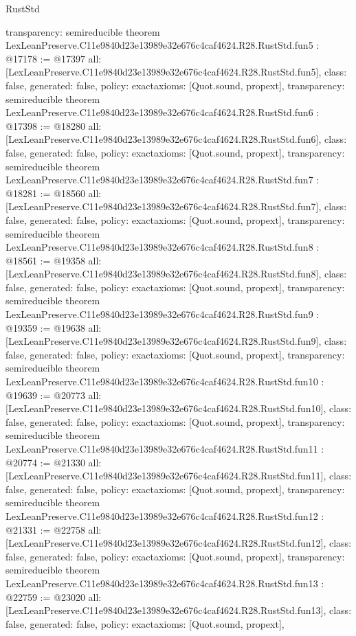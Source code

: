 \begin{lexlean}{RustStd}
\begin{coremodule}
{  transparency: semireducible
}
theorem LexLeanPreserve.C11e9840d23e13989e32e676c4caf4624.R28.RustStd.fun5 : @17178 := @17397 {
  all: [LexLeanPreserve.C11e9840d23e13989e32e676c4caf4624.R28.RustStd.fun5],
  class: false,
  generated: false,
  policy: exact{axioms: [Quot.sound, propext]},
  transparency: semireducible
}
theorem LexLeanPreserve.C11e9840d23e13989e32e676c4caf4624.R28.RustStd.fun6 : @17398 := @18280 {
  all: [LexLeanPreserve.C11e9840d23e13989e32e676c4caf4624.R28.RustStd.fun6],
  class: false,
  generated: false,
  policy: exact{axioms: [Quot.sound, propext]},
  transparency: semireducible
}
theorem LexLeanPreserve.C11e9840d23e13989e32e676c4caf4624.R28.RustStd.fun7 : @18281 := @18560 {
  all: [LexLeanPreserve.C11e9840d23e13989e32e676c4caf4624.R28.RustStd.fun7],
  class: false,
  generated: false,
  policy: exact{axioms: [Quot.sound, propext]},
  transparency: semireducible
}
theorem LexLeanPreserve.C11e9840d23e13989e32e676c4caf4624.R28.RustStd.fun8 : @18561 := @19358 {
  all: [LexLeanPreserve.C11e9840d23e13989e32e676c4caf4624.R28.RustStd.fun8],
  class: false,
  generated: false,
  policy: exact{axioms: [Quot.sound, propext]},
  transparency: semireducible
}
theorem LexLeanPreserve.C11e9840d23e13989e32e676c4caf4624.R28.RustStd.fun9 : @19359 := @19638 {
  all: [LexLeanPreserve.C11e9840d23e13989e32e676c4caf4624.R28.RustStd.fun9],
  class: false,
  generated: false,
  policy: exact{axioms: [Quot.sound, propext]},
  transparency: semireducible
}
theorem LexLeanPreserve.C11e9840d23e13989e32e676c4caf4624.R28.RustStd.fun10 : @19639 := @20773 {
  all: [LexLeanPreserve.C11e9840d23e13989e32e676c4caf4624.R28.RustStd.fun10],
  class: false,
  generated: false,
  policy: exact{axioms: [Quot.sound, propext]},
  transparency: semireducible
}
theorem LexLeanPreserve.C11e9840d23e13989e32e676c4caf4624.R28.RustStd.fun11 : @20774 := @21330 {
  all: [LexLeanPreserve.C11e9840d23e13989e32e676c4caf4624.R28.RustStd.fun11],
  class: false,
  generated: false,
  policy: exact{axioms: [Quot.sound, propext]},
  transparency: semireducible
}
theorem LexLeanPreserve.C11e9840d23e13989e32e676c4caf4624.R28.RustStd.fun12 : @21331 := @22758 {
  all: [LexLeanPreserve.C11e9840d23e13989e32e676c4caf4624.R28.RustStd.fun12],
  class: false,
  generated: false,
  policy: exact{axioms: [Quot.sound, propext]},
  transparency: semireducible
}
theorem LexLeanPreserve.C11e9840d23e13989e32e676c4caf4624.R28.RustStd.fun13 : @22759 := @23020 {
  all: [LexLeanPreserve.C11e9840d23e13989e32e676c4caf4624.R28.RustStd.fun13],
  class: false,
  generated: false,
  policy: exact{axioms: [Quot.sound, propext]},
}
\end{coremodule}
\end{lexlean}
